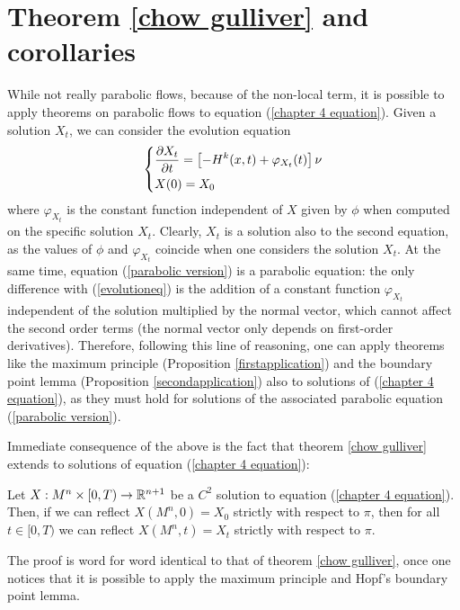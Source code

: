 \section{Theorem \ref{chow gulliver} and corollaries}
While not really parabolic flows, because of the non-local term, it is possible to apply theorems on parabolic flows to equation (\ref{chapter 4 equation}). Given a solution $X_t$, we can consider the evolution equation 
\begin{align}
	\begin{dcases}
		\frac{\partial X_t}{\partial t} = \left[- H^k(x, t) + \varphi_{X_t}(t)\right] \nu\\
		X(0)= X_0
	\end{dcases} \label{parabolic version}
\end{align}
where $\varphi_{X_t}$ is the constant function independent of $X$ given by $\phi$ when computed on the specific solution $X_t$. 
Clearly, $X_t$ is a solution also to the second equation, as the values of  $\phi$ and $\varphi_{X_t}$ coincide when one considers the solution $X_t$. At the same time, equation (\ref{parabolic version}) is a parabolic equation: the only difference with (\ref{evolutioneq}) is the addition of a constant function $\varphi_{X_t}$ independent of the solution multiplied by the normal vector, which cannot affect the second order terms (the normal vector only depends on first-order derivatives). Therefore, following this line of reasoning, one can apply theorems like the maximum principle (Proposition \ref{firstapplication}) and the boundary point lemma (Proposition \ref{secondapplication}) also to solutions of (\ref{chapter 4 equation}), as they must hold for solutions of the associated parabolic equation (\ref{parabolic version}). %

Immediate consequence of the above is the fact that theorem \ref{chow gulliver} extends to solutions of equation (\ref{chapter 4 equation}):

\begin{theorem}
	Let $X:M^n\times [0,T) \rightarrow \mathbb{R}^{n+1}$ be a $C^2$ solution to equation (\ref{chapter 4 equation}). Then, if we can reflect $X(M^n, 0)=X_0$ strictly with respect to $\pi$, then for all $t\in [0,T)$ we can reflect $X(M^n, t)=X_t$ strictly with respect to $\pi$. 
\end{theorem}

The proof is word for word identical to that of theorem \ref{chow gulliver}, once one notices that it is possible to apply the maximum principle and Hopf's boundary point lemma. 


